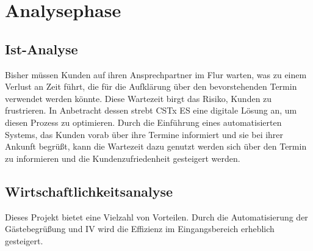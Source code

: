 \section{Analysephase} 
\label{sec:Analysephase}


\subsection{Ist-Analyse} 
\label{sec:IstAnalyse}
Bisher müssen Kunden auf ihren Ansprechpartner im Flur warten, was zu einem Verlust an Zeit führt, die für die Aufklärung über den bevorstehenden Termin verwendet werden könnte.
Diese Wartezeit birgt das Risiko, Kunden zu frustrieren.
In Anbetracht dessen strebt \ac{CSTx ES} eine digitale Lösung an, um diesen Prozess zu optimieren.
Durch die Einführung eines automatisierten Systems, das Kunden vorab über ihre Termine informiert und sie bei ihrer Ankunft begrüßt, kann die Wartezeit dazu genutzt werden sich über den Termin zu informieren und die Kundenzufriedenheit gesteigert werden.

\subsection{Wirtschaftlichkeitsanalyse}
\label{sec:Wirtschaftlichkeitsanalyse}
Dieses Projekt bietet eine Vielzahl von Vorteilen.
Durch die Automatisierung der Gästebegrüßung und \ac{IV} wird die Effizienz im Eingangsbereich erheblich gesteigert.


